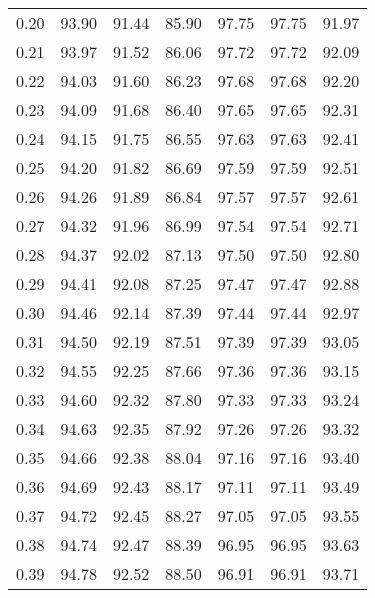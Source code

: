 \begin{tabular}{|c|c|c|c|c|c|c|}
      0.20 &     93.90 &     91.44 &      85.90 &   97.75 &      97.75 &         91.97 \\
      0.21 &     93.97 &     91.52 &      86.06 &   97.72 &      97.72 &         92.09 \\
      0.22 &     94.03 &     91.60 &      86.23 &   97.68 &      97.68 &         92.20 \\
      0.23 &     94.09 &     91.68 &      86.40 &   97.65 &      97.65 &         92.31 \\
      0.24 &     94.15 &     91.75 &      86.55 &   97.63 &      97.63 &         92.41 \\
      0.25 &     94.20 &     91.82 &      86.69 &   97.59 &      97.59 &         92.51 \\
      0.26 &     94.26 &     91.89 &      86.84 &   97.57 &      97.57 &         92.61 \\
      0.27 &     94.32 &     91.96 &      86.99 &   97.54 &      97.54 &         92.71 \\
      0.28 &     94.37 &     92.02 &      87.13 &   97.50 &      97.50 &         92.80 \\
      0.29 &     94.41 &     92.08 &      87.25 &   97.47 &      97.47 &         92.88 \\
      0.30 &     94.46 &     92.14 &      87.39 &   97.44 &      97.44 &         92.97 \\
      0.31 &     94.50 &     92.19 &      87.51 &   97.39 &      97.39 &         93.05 \\
      0.32 &     94.55 &     92.25 &      87.66 &   97.36 &      97.36 &         93.15 \\
      0.33 &     94.60 &     92.32 &      87.80 &   97.33 &      97.33 &         93.24 \\
      0.34 &     94.63 &     92.35 &      87.92 &   97.26 &      97.26 &         93.32 \\
      0.35 &     94.66 &     92.38 &      88.04 &   97.16 &      97.16 &         93.40 \\
      0.36 &     94.69 &     92.43 &      88.17 &   97.11 &      97.11 &         93.49 \\
      0.37 &     94.72 &     92.45 &      88.27 &   97.05 &      97.05 &         93.55 \\
      0.38 &     94.74 &     92.47 &      88.39 &   96.95 &      96.95 &         93.63 \\
      0.39 &     94.78 &     92.52 &      88.50 &   96.91 &      96.91 &         93.71 \\

\end{tabular}
